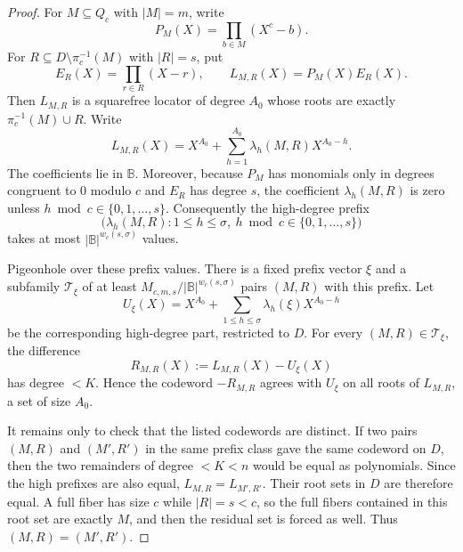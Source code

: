 \documentclass[11pt]{article}
\theoremstyle{definition}
\theoremstyle{remark}
\newcommand{\B}{\mathbb{B}}
\begin{document}
\begin{proof}
For $M\subseteq Q_c$ with $|M|=m$, write
\[
        P_M(X)=\prod_{b\in M}(X^c-b).
\]
For $R\subseteq D\setminus \pi_c^{-1}(M)$ with $|R|=s$, put
\[
        E_R(X)=\prod_{r\in R}(X-r),
        \qquad
        L_{M,R}(X)=P_M(X)E_R(X).
\]
Then $L_{M,R}$ is a squarefree locator of degree $A_0$ whose roots are exactly
\(\pi_c^{-1}(M)\cup R\).  Write
\[
        L_{M,R}(X)=X^{A_0}+\sum_{h=1}^{A_0}\lambda_h(M,R)X^{A_0-h}.
\]
The coefficients lie in $\B$.  Moreover, because $P_M$ has monomials only in
degrees congruent to $0$ modulo $c$ and $E_R$ has degree $s$, the coefficient
$\lambda_h(M,R)$ is zero unless $h\bmod c\in\{0,1,\ldots,s\}$.
Consequently the high-degree prefix
\[
        \bigl(\lambda_h(M,R):1\le h\le\sigma,
              \ h\bmod c\in\{0,1,\ldots,s\}\bigr)
\]
takes at most $|\B|^{w_c(s,\sigma)}$ values.

Pigeonhole over these prefix values.  There is a fixed prefix vector $\xi$ and a
subfamily $\mathcal T_\xi$ of at least
$M_{c,m,s}/|\B|^{w_c(s,\sigma)}$ pairs $(M,R)$ with this prefix.  Let
\[
        U_\xi(X)=X^{A_0}+\sum_{1\le h\le\sigma}\lambda_h(\xi)X^{A_0-h}
\]
be the corresponding high-degree part, restricted to $D$.  For every
$(M,R)\in\mathcal T_\xi$, the difference
\[
        R_{M,R}(X):=L_{M,R}(X)-U_\xi(X)
\]
has degree $<K$.  Hence the codeword $-R_{M,R}$ agrees with $U_\xi$ on all
roots of $L_{M,R}$, a set of size $A_0$.

It remains only to check that the listed codewords are distinct.  If two pairs
$(M,R)$ and $(M',R')$ in the same prefix class gave the same codeword on $D$,
then the two remainders of degree $<K<n$ would be equal as polynomials.  Since
the high prefixes are also equal, $L_{M,R}=L_{M',R'}$.  Their root sets in $D$
are therefore equal.  A full fiber has size $c$ while $|R|=s<c$, so the full
fibers contained in this root set are exactly $M$, and then the residual set is
forced as well.  Thus $(M,R)=(M',R')$.
\end{proof}
\end{document}
